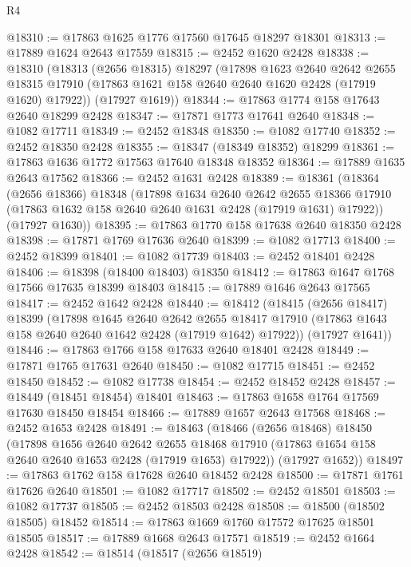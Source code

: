 \begin{lexlean}{R4}
\begin{coremodule}
@18310 := @17863 @1625 @1776 @17560 @17645 @18297 @18301
@18313 := @17889 @1624 @2643 @17559
@18315 := @2452 @1620 @2428
@18338 := @18310
    (@18313
      (@2656 @18315)
      @18297
      (@17898
        @1623
        @2640
        @2642
        @2655
        @18315
        @17910
        (@17863 @1621 @158 @2640 @2640 @1620 @2428 (@17919 @1620) @17922))
      (@17927 @1619))
@18344 := @17863 @1774 @158 @17643 @2640 @18299 @2428
@18347 := @17871 @1773 @17641 @2640
@18348 := @1082 @17711
@18349 := @2452 @18348
@18350 := @1082 @17740
@18352 := @2452 @18350 @2428
@18355 := @18347 (@18349 @18352) @18299
@18361 := @17863 @1636 @1772 @17563 @17640 @18348 @18352
@18364 := @17889 @1635 @2643 @17562
@18366 := @2452 @1631 @2428
@18389 := @18361
    (@18364
      (@2656 @18366)
      @18348
      (@17898
        @1634
        @2640
        @2642
        @2655
        @18366
        @17910
        (@17863 @1632 @158 @2640 @2640 @1631 @2428 (@17919 @1631) @17922))
      (@17927 @1630))
@18395 := @17863 @1770 @158 @17638 @2640 @18350 @2428
@18398 := @17871 @1769 @17636 @2640
@18399 := @1082 @17713
@18400 := @2452 @18399
@18401 := @1082 @17739
@18403 := @2452 @18401 @2428
@18406 := @18398 (@18400 @18403) @18350
@18412 := @17863 @1647 @1768 @17566 @17635 @18399 @18403
@18415 := @17889 @1646 @2643 @17565
@18417 := @2452 @1642 @2428
@18440 := @18412
    (@18415
      (@2656 @18417)
      @18399
      (@17898
        @1645
        @2640
        @2642
        @2655
        @18417
        @17910
        (@17863 @1643 @158 @2640 @2640 @1642 @2428 (@17919 @1642) @17922))
      (@17927 @1641))
@18446 := @17863 @1766 @158 @17633 @2640 @18401 @2428
@18449 := @17871 @1765 @17631 @2640
@18450 := @1082 @17715
@18451 := @2452 @18450
@18452 := @1082 @17738
@18454 := @2452 @18452 @2428
@18457 := @18449 (@18451 @18454) @18401
@18463 := @17863 @1658 @1764 @17569 @17630 @18450 @18454
@18466 := @17889 @1657 @2643 @17568
@18468 := @2452 @1653 @2428
@18491 := @18463
    (@18466
      (@2656 @18468)
      @18450
      (@17898
        @1656
        @2640
        @2642
        @2655
        @18468
        @17910
        (@17863 @1654 @158 @2640 @2640 @1653 @2428 (@17919 @1653) @17922))
      (@17927 @1652))
@18497 := @17863 @1762 @158 @17628 @2640 @18452 @2428
@18500 := @17871 @1761 @17626 @2640
@18501 := @1082 @17717
@18502 := @2452 @18501
@18503 := @1082 @17737
@18505 := @2452 @18503 @2428
@18508 := @18500 (@18502 @18505) @18452
@18514 := @17863 @1669 @1760 @17572 @17625 @18501 @18505
@18517 := @17889 @1668 @2643 @17571
@18519 := @2452 @1664 @2428
@18542 := @18514
    (@18517
      (@2656 @18519)

\end{coremodule}
\end{lexlean}

